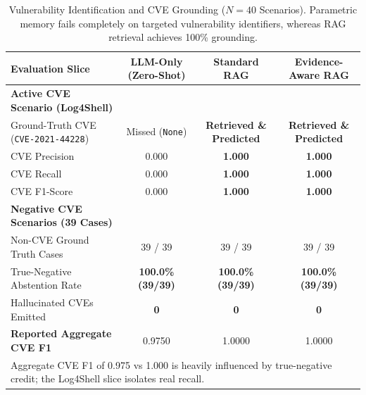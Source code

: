 \begin{table}[h]
\centering
\small
\caption{Vulnerability Identification and CVE Grounding ($N = 40$ Scenarios). Parametric memory fails completely on targeted vulnerability identifiers, whereas RAG retrieval achieves 100\% grounding.}
\label{tab:cve_grounding}
\begin{tabular}{lccc}
\toprule
\textbf{Evaluation Slice} & \textbf{LLM-Only (Zero-Shot)} & \textbf{Standard RAG} & \textbf{Evidence-Aware RAG} \\
\midrule
\textbf{Active CVE Scenario (Log4Shell)} & & & \\
\quad Ground-Truth CVE (\texttt{CVE-2021-44228}) & Missed (\texttt{None}) & \textbf{Retrieved \& Predicted} & \textbf{Retrieved \& Predicted} \\
\quad CVE Precision & 0.000 & \textbf{1.000} & \textbf{1.000} \\
\quad CVE Recall & 0.000 & \textbf{1.000} & \textbf{1.000} \\
\quad CVE F1-Score & 0.000 & \textbf{1.000} & \textbf{1.000} \\
\midrule
\textbf{Negative CVE Scenarios (39 Cases)} & & & \\
\quad Non-CVE Ground Truth Cases & 39 / 39 & 39 / 39 & 39 / 39 \\
\quad True-Negative Abstention Rate & \textbf{100.0\% (39/39)} & \textbf{100.0\% (39/39)} & \textbf{100.0\% (39/39)} \\
\quad Hallucinated CVEs Emitted & \textbf{0} & \textbf{0} & \textbf{0} \\
\midrule
\textbf{Reported Aggregate CVE F1} & 0.9750 & 1.0000 & 1.0000 \\
\bottomrule
\multicolumn{4}{l}{\footnotesize Aggregate CVE F1 of 0.975 vs 1.000 is heavily influenced by true-negative credit; the Log4Shell slice isolates real recall.}
\end{tabular}
\end{table}

